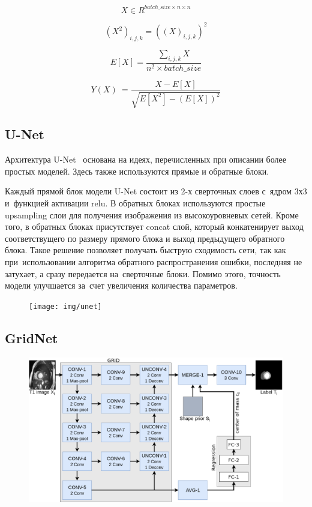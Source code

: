 \begin{equation}
\label{eq:mvn_input_batch}
X\in{}R^{batch\_size\times{}n\times{}n}
\end{equation}

\begin{equation}
\label{eq:mvn_squared_batch}
(X^{2})_{i,j,k}=((X)_{i,j,k})^{2}
\end{equation}

\begin{equation}
\label{eq:mvn_expected_value}
E[X]=\frac{
  \sum_{i,j,k}X
}{
  n^{2}\times{}batch\_size
}
\end{equation} 

\begin{equation}
\label{eq:mvn}
Y(X)\ = \frac{
  X - E[X]
}{\sqrt{
  E[X^{2}] - (E[X])^2
}}
\end{equation}

\subsection{U-Net}

Архитектура U-Net~\cite{unet} основана на идеях, 
перечисленных при описании более простых моделей. 
Здесь также используются прямые и обратные блоки. 

Каждый прямой блок модели U-Net состоит из 2-х сверточных слоев 
с~ядром 3х3 и~функцией активации relu. В обратных блоках используются 
простые upsampling слои для получения изображения из высокоуровневых сетей. 
Кроме того, в обратных блоках присутствует concat слой, который конкатенирует 
выход соответствущего по размеру прямого блока и выход предыдущего обратного блока. 
Такое решение позволяет получать быструю сходимость сети, так как при~использовании 
алгоритма обратного распространения ошибки, последняя не затухает, а сразу передается 
на~сверточные блоки. Помимо этого, точность модели улучшается за~счет увеличения 
количества параметров.   

\begin{figure}[hb]
  \texttt{[image: img/unet]}
\end{figure}

\newpage
\subsection{GridNet}

\begin{figure}[ht]
  \includegraphics[width=\textwidth,keepratio]{img/gridnet}
\end{figure}

